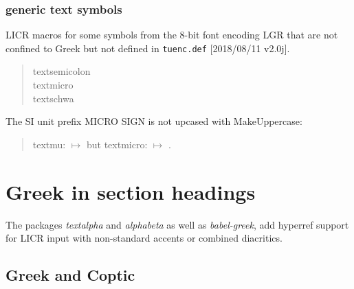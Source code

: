 \documentclass[a4paper]{article}
\begin{document}
\subsubsection{generic text symbols}

LICR macros for some symbols from the 8-bit font encoding LGR that are not
confined to Greek but not defined in \texttt{tuenc.def} [2018/08/11 v2.0j].

\begin{quote}
  \textsemicolon{} textsemicolon\\
  \textmicro{} textmicro \\
  \textschwa{} textschwa
\end{quote}
The SI unit prefix MICRO SIGN is not upcased with MakeUppercase:

\begin{quote}
  textmu: \textmu{} $\mapsto$ \MakeUppercase{\textmu} but
  textmicro: \textmicro{} $\mapsto$ \MakeUppercase{\textmicro}.
\end{quote}

\section{Greek in section headings}

The packages \emph{textalpha} and \emph{alphabeta} as well as
\emph{babel-greek}, add hyperref support for LICR input with
non-standard accents or combined diacritics.

\subsection{Greek and Coptic}

\subsubsection{}
\subsubsection{\ensuregreek{
  \textAlpha
  \textBeta
  \textGamma
  \textDelta
  \textEpsilon
  \textZeta
  \textEta
  \textTheta
  \textIota
  \textKappa
  \textLambda
  \textMu
  \textNu
  \textXi
  \textOmicron
  \textPi
  \textRho
  \textSigma
  \textTau
  \textUpsilon
  \textPhi
  \textChi
  \textPsi
  \textOmega
}}
\end{document}
